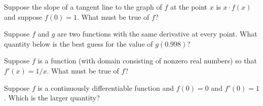 \documentclass{ximera}
\newcommand{\recommendation}[1]{}
\begin{document}
\begin{shuffle}
\begin{problem}
  Suppose the slope of a tangent line to the graph of $f$ at the point $x$ is $x \cdot f(x)$ and suppose $f(0) = 1$.  What must be true of $f$?
  \begin{multipleChoice}
  \end{multipleChoice}
\end{problem}



\begin{problem}
  Suppose $f$ and $g$ are two functions with the same derivative at every point.  What quantity below is the best guess for the value of $g(0.998)$?
  \begin{multipleChoice}
  \end{multipleChoice}
\end{problem}

\begin{problem}
  Suppose $f$ is a function (with domain consisting of nonzero real numbers) so that $f'(x) = 1/x$.  What must be true of $f$?
  \begin{multipleChoice}
  \end{multipleChoice}
\end{problem}



\begin{problem}
  Suppose $f$ is a continuously differentiable function and $f(0) = 0$ and $f'(0) = 1$.  Which is the larger quantity?
  \begin{multipleChoice}
  \end{multipleChoice}
\end{problem}


\end{shuffle}
\end{document}
